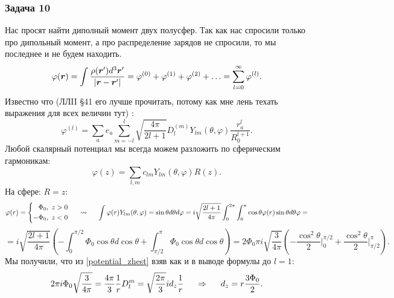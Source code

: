 \subsubsection*{Задача 10}
Нас просят найти диполный момент двух полусфер.
Так как нас спросили только про дипольный момент, а про распределение зарядов не спросили, то мы последнее и не будем находить.
\begin{equation*}
	\varphi(\mbox{\boldmath $r$}) = \int \frac{\rho(\mbox{\boldmath $r$}') d^3 \mbox{\boldmath $r$}'}{|\mbox{\boldmath $r$} - \mbox{\boldmath $r$}'|}
	 = \varphi^{(0)} + \varphi^{(1)} + \varphi^{(2)} + \ldots = \sum_{l=0}^\infty \varphi^{(l)}.
\end{equation*}
Известно что (ЛЛII \S 41 его лучше прочитать, потому как мне лень техать выражения для всех величин тут) :
\begin{equation}
	\varphi^{(l)} = \sum_a e_a\sum_{m = -l}^l \sqrt{\frac{4 \pi}{2 l +1}} D_l^{(m)} Y_{l m} (\theta, \varphi) \frac{r_a^l}{R_0^{l+1}}.
	\label{potential_zhest}
\end{equation}
Любой скалярный потенциал мы всегда можем разложить по сферическим гармоникам:
\begin{equation*}
	\varphi(z) = \sum_{l,m} c_{lm} Y_{lm}(\theta,\varphi) R(z).
\end{equation*}
На сфере: $R=z$:
\begin{equation*}
 \varphi(r) =
	\left\{
	\begin{aligned}
		\Phi_0, \ z>0 \\
		-\Phi_0, \ z<0
	\end{aligned}
	\right.
	\hspace{0.5 cm}
	\leadsto
	\hspace{0.5 cm}
	\int \varphi(r) Y_{l m} (\theta, \varphi) = \sin \theta d \theta d\varphi
	=
	i \sqrt{\frac{2 l +1}{4 \pi}} \int_0^{2\pi} \int_0^\pi \cos \theta \varphi(r) \sin \theta d \theta \varphi =
\end{equation*}
\begin{equation*}
	= i \sqrt{\frac{2 l +1}{4 \pi}} \left(
	-\int_0^{\pi/2} \Phi_0 \cos \theta d \cos \theta + \int_{\pi/2}^\pi \Phi_0 \cos \theta d \cos \theta
	\right)
	=
	2 \Phi_0 \pi i \sqrt{\frac{3}{4 \pi}}\left(
	- \frac{\cos ^2 \theta}{2}\bigg|_0^{\pi/2} + \frac{\cos^2 \theta}{2}\bigg|_{\pi/2}^\pi 
	\right).
\end{equation*}
Мы получили, что из \eqref{potential_zhest} взяв как и в выводе формулы до $l=1$:
\begin{equation*}
	2 \pi i \Phi_0 \sqrt{\frac{3}{4\pi}} = \frac{4 \pi}{3} \frac{1}{r} D_l^m = \sqrt{\frac{2 \pi}{3}} i d_z \frac{1}{r}
	\hspace{0.5 cm}
	\Rightarrow
	\hspace{0.5 cm}
	d_z = r \frac{3 \Phi_0}{2}.
\end{equation*}

